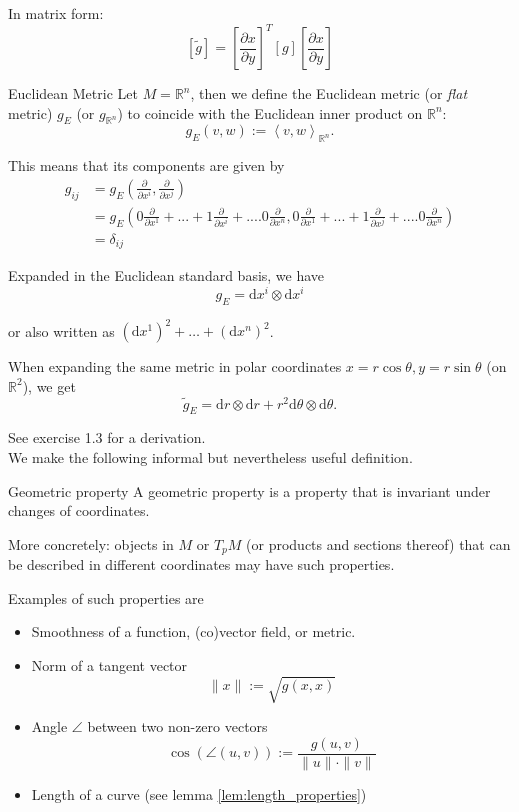 In matrix form:
\[
[\tilde{g}] = \left[\frac{\partial x}{\partial y}\right]^T [g] \left[\frac{\partial x}{\partial y}\right]
\]

\begin{colordef}{Euclidean Metric}{}
Let $M=\mathbb{R}^n$, then we define the Euclidean metric (or \emph{flat} metric) $g_E$ (or $g_{\mathbb{R}^n}$) to coincide with the Euclidean inner product on $\mathbb{R}^n$:
\[
g_E\left(v,w\right) :=  \left \langle v,w \right \rangle_{\mathbb{R}^n}.
\]
\end{colordef}

This means that its components are given by
\begin{align*}
    g_{ij}&=
    g_E\left(\frac{\partial}{\partial x^i}, \frac{\partial}{\partial x^j}\right) \\
    &=g_E\left(
        0\frac{\partial}{\partial x^1}+...+1\frac{\partial}{\partial x^i}+....0\frac{\partial}{\partial x^n},
        0\frac{\partial}{\partial x^1}+...+1\frac{\partial}{\partial x^j}+....0\frac{\partial}{\partial x^n}\right)\\
    &= \delta_{ij}
\end{align*}

Expanded in the Euclidean standard basis, we have
$$g_E =  \mathrm{d}x^i \otimes \mathrm{d}x^i$$

or also written as $(\mathrm{d}x^1)^2 + \dots + (\mathrm{d}x^n)^2$.

When expanding the same metric in polar coordinates $x = r \cos \theta,  y = r \sin \theta$ (on $\mathbb{R}^2$), we get
$$\tilde{g}_E = \mathrm{d}r\otimes \mathrm{d}r + r^2 \mathrm{d}\theta\otimes \mathrm{d}\theta.$$

See exercise 1.3 for a derivation.\\


We make the following informal but nevertheless useful definition.

\begin{colordef}{Geometric property}{}
A geometric property is a property that is invariant under changes of coordinates.
\end{colordef}
More concretely: objects in $M$ or $T_pM$ (or products and sections thereof) that can be described in different coordinates may have such properties.

Examples of such properties are

\begin{itemize}
    \item Smoothness of a function, (co)vector field, or metric.
    \item Norm of a tangent vector
    \[
    \|x\| := \sqrt{g(x, x)}
    \]
    \item Angle $\angle$ between two non-zero vectors
    \[
    \cos \left( \angle(u, v) \right) := \frac{g(u, v)}{\|u\| \cdot \|v\|}
    \]
    \item Length of a curve (see lemma \ref{lem:length_properties})
\end{itemize}


